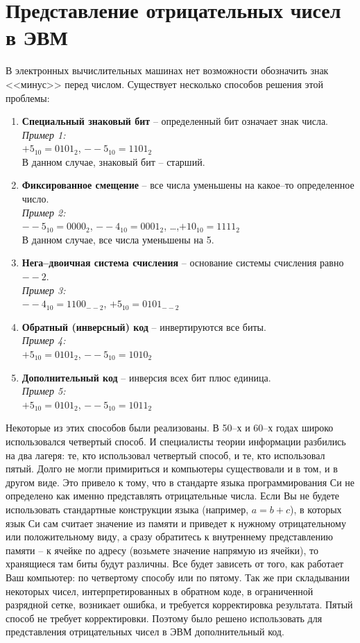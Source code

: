\section{Представление отрицательных чисел в ЭВМ}

В электронных вычислительных машинах нет возможности обозначить знак <<минус>> перед числом. Существует несколько способов решения этой проблемы:
\begin{enumerate}
\item \textbf{Специальный знаковый бит} -- определенный бит означает знак числа.
\\\emph{Пример 1:}
\\$+5_{10} = 0101_{2}$, $--5_{10} = 1101_{2}$
\\В данном случае, знаковый бит -- старший.
\item \textbf{Фиксированное смещение} -- все числа уменьшены на какое--то определенное число.
\\\emph{Пример 2:}
\\$--5_{10} = 0000_{2}$, $--4_{10} = 0001_{2}$, \dots ,$+10_{10} = 1111_{2}$
\\В данном случае, все числа уменьшены на 5.
\item \textbf{Нега--двоичная система счисления} -- основание системы счисления равно $--2$.
\\\emph{Пример 3:}
\\$--4_{10} = 1100_{--2}$, $+5_{10} = 0101_{--2}$
\item \textbf{Обратный (инверсный) код} -- инвертируются все биты.
\\\emph{Пример 4:}
\\$+5_{10} = 0101_{2}$, $--5_{10} = 1010_{2}$
\item \textbf{Дополнительный код} -- инверсия всех бит плюс единица.
\\\emph{Пример 5:}
\\$+5_{10} = 0101_{2}$, $--5_{10} = 1011_{2}$
\end{enumerate}

Некоторые из этих способов были реализованы. В 50--х и 60--х годах широко использовался четвертый способ. И специалисты теории информации разбились на два лагеря: те, кто использовал четвертый способ, и те, кто использовал пятый. Долго не могли примириться и компьютеры существовали и в том, и в другом виде. Это привело к тому, что в стандарте языка программирования Си не определено как именно представлять отрицательные числа. Если Вы не будете использовать стандартные конструкции языка (например, $a = b + c$), в которых язык Си сам считает значение из памяти и приведет к нужному отрицательному или положительному виду, а сразу обратитесь к внутреннему представлению памяти -- к ячейке по адресу (возьмете значение напрямую из ячейки), то хранящиеся там биты будут различны. Все будет зависеть от того, как работает Ваш компьютер: по четвертому способу или по пятому. Так же при складывании некоторых чисел, интерпретированных в обратном коде, в ограниченной разрядной сетке, возникает ошибка, и требуется корректировка результата. Пятый способ не требует корректировки. Поэтому было решено использовать для представления отрицательных чисел в ЭВМ дополнительный код.

